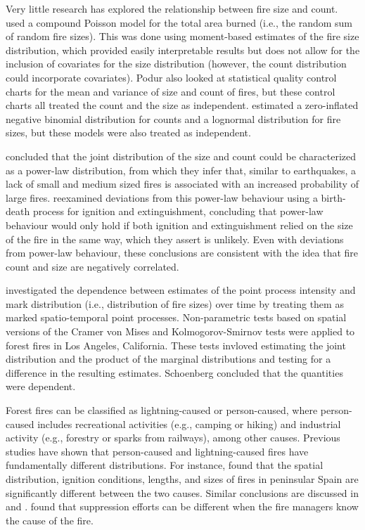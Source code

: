 \documentclass[10pt,letterpaper]{article}
\begin{document}
Very little research has explored the relationship between fire size and
count. \cite{podurCompoundPoissonModel2009} used a compound Poisson
model for the total area burned (i.e., the random sum of random fire
sizes). This was done using moment-based estimates of the fire size
distribution, which provided easily interpretable results but does not
allow for the inclusion of covariates for the size distribution
(however, the count distribution could incorporate covariates). Podur
also looked at statistical quality control charts for the mean and
variance of size and count of fires, but these control charts all treated the count and the size as independent.
\cite{josephSpatiotemporalPredictionWildfire2019} estimated a
zero-inflated negative binomial distribution for counts and a lognormal
distribution for fire sizes, but these models were also treated as
independent.

\cite{malamudForestFiresExample1998} concluded that the joint
distribution of the size and count could be characterized as a power-law
distribution, from which they infer that, similar to earthquakes, a lack
of small and medium sized fires is associated with an increased
probability of large fires. \cite{reedPowerlawBehaviourParametric2002}
reexamined deviations from this power-law behaviour using a birth-death
process for ignition and extinguishment, concluding that power-law
behaviour would only hold if both ignition and extinguishment relied on
the size of the fire in the same way, which they assert is unlikely.
Even with deviations from power-law behaviour, these conclusions are
consistent with the idea that fire count and size are negatively
correlated.

\cite{paikschoenbergTestingSeparabilitySpatialTemporal2004}
investigated the dependence between estimates of the point process
intensity and mark distribution (i.e., distribution of fire sizes) over
time by treating them as marked spatio-temporal point processes.
Non-parametric tests based on spatial versions of the Cramer von Mises
and Kolmogorov-Smirnov tests were applied to forest fires in Los
Angeles, California. These tests invloved estimating the joint
distribution and the product of the marginal distributions and testing
for a difference in the resulting estimates. Schoenberg concluded that
the quantities were dependent.

Forest fires can be classified as lightning-caused or person-caused,
where person-caused includes recreational activities (e.g., camping or
hiking) and industrial activity (e.g., forestry or sparks from
railways), among other causes. Previous studies have shown that
person-caused and lightning-caused fires have fundamentally
different distributions. For instance,
\cite{vazquezPatternsLightningPeopleCaused1998} found that the spatial
distribution, ignition conditions, lengths, and sizes of fires in
peninsular Spain are significantly different between the two causes.
Similar conclusions are discussed in
\cite{burkeHistoricFiresCentral2014} and
\cite{keeleyDistributionLightningManCaused1982}.
\cite{keenshawSituationalInfluencesAcceptable2004} found that
suppression efforts can be different when the fire managers know the
cause of the fire.
\end{document}
